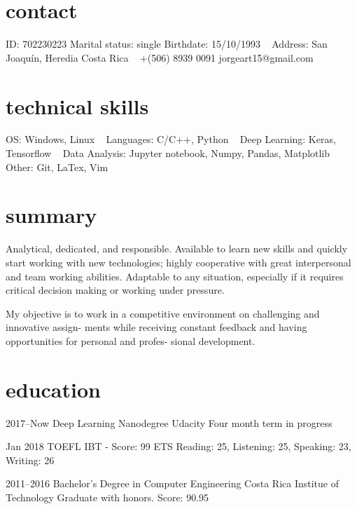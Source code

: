 \documentclass[]{friggeri-cv} %
\begin{document}


\begin{aside} %
\section{contact}
ID: 702230223
Marital status: single
Birthdate: 15/10/1993
~
Address:
San Joaquín, Heredia
Costa Rica
~
+(506) 8939 0091
jorgeart15@gmail.com
~
\section{technical skills}
OS:
Windows, Linux
~
Languages: 
C/C++, Python
~
Deep Learning:
Keras, Tensorflow
~
Data Analysis:
Jupyter notebook, Numpy, Pandas, Matplotlib
~
Other: 
Git, LaTex, Vim
\end{aside}



\section{summary}
Analytical, dedicated, and responsible. Available to learn new skills and quickly start working
with new technologies; highly cooperative with great interpersonal and team working abilities.
Adaptable to any situation, especially if it requires critical decision making or working under
pressure.

My objective is to work in a competitive environment on challenging and innovative assign-
ments while receiving constant feedback and having opportunities for personal and profes-
sional development.


\section{education}
\begin{entrylist}

\entry
{2017–Now}
{Deep Learning Nanodegree}
{Udacity}
{Four month term in progress}

\entry
{Jan 2018}
{TOEFL IBT {\normalfont - Score: 99}}
{ETS}
{Reading: 25, Listening: 25, Speaking: 23, Writing: 26}

\entry
{2011--2016}
{Bachelor's Degree in Computer Engineering}
{Costa Rica Institue of Technology}
{Graduate with honors. Score: 90.95}

\end{entrylist}
\end{document}

